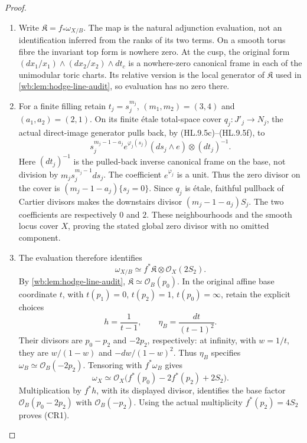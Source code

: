 \begin{proof}
\begin{enumerate}[label=\arabic*.,leftmargin=*]
\item Write $\mathfrak K=f_*\omega_{X/B}$. The map is the natural adjunction
evaluation, not an identification inferred from the ranks of its two
terms. On a smooth torus fibre the invariant top form is nowhere zero.
At the cusp, the original form
$(dx_1/x_1)\wedge(dx_2/x_2)\wedge dt_c$ is a nowhere-zero canonical
frame in each of the unimodular toric charts. Its relative version is
the local generator of $\mathfrak K$ used in
\cref{wb:lem:hodge-line-audit}, so evaluation has no zero there.

\item For a finite filling retain $t_j=s_j^{m_j}$,
$(m_1,m_2)=(3,4)$ and $(a_1,a_2)=(2,1)$. On its finite \'etale
total-space cover $q_j:J'_j\to N_j$, the actual direct-image generator
pulls back, by (HL.9.5c)--(HL.9.5f), to
\[
 s_j^{m_j-1-a_j}e^{\varphi_j(s_j)}
       (ds_j\wedge e)\otimes(dt_j)^{-1}.
 \tag{CR5}
\]
Here $(dt_j)^{-1}$ is the pulled-back inverse canonical frame on the
base, not division by $m_js_j^{m_j-1}ds_j$. The coefficient
$e^{\varphi_j}$ is a unit. Thus the zero divisor on the cover is
$(m_j-1-a_j)\{s_j=0\}$. Since $q_j$ is \'etale, faithful pullback
of Cartier divisors makes the downstairs divisor
$(m_j-1-a_j)S_j$. The two coefficients are respectively $0$ and $2$.
These neighbourhoods and the smooth locus cover $X$, proving the stated
global zero divisor with no omitted component.

\item The evaluation therefore identifies
\[
 \omega_{X/B}\simeq f^*\mathfrak K\otimes\mathcal O_X(2S_2).
\]
By \cref{wb:lem:hodge-line-audit}, $\mathfrak K\simeq\mathcal O_B(p_0)$.
In the original affine base coordinate $t$, with
$t(p_1)=0$, $t(p_2)=1$, $t(p_0)=\infty$, retain the explicit choices
\[
 h=\frac1{t-1},\qquad \eta_B=\frac{dt}{(t-1)^2}.
\]
Their divisors are $p_0-p_2$ and $-2p_2$, respectively: at infinity,
with $w=1/t$, they are $w/(1-w)$ and $-dw/(1-w)^2$.
Thus $\eta_B$ specifies $\omega_B\simeq\mathcal O_B(-2p_2)$.
Tensoring with $f^*\omega_B$ gives
\[
 \omega_X\simeq
 \mathcal O_X\bigl(f^*(p_0)-2f^*(p_2)+2S_2\bigr).
\]
Multiplication by $f^*h$, with its displayed divisor, identifies the
base factor $\mathcal O_B(p_0-2p_2)$ with $\mathcal O_B(-p_2)$.
Using the actual multiplicity $f^*(p_2)=4S_2$ proves (CR1).


\end{enumerate}
\end{proof}
